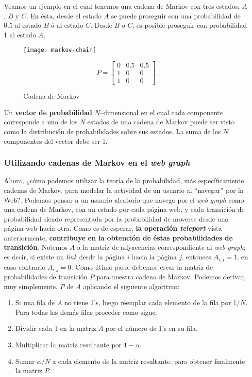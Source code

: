 			Veamos un ejemplo en el cual tenemos una cadena de Markov con tres estados: $A$, $B$ y $C$. En ésta, desde el estado $A$ se puede proseguir con una probabilidad de 0.5 al estado $B$ ó al estado $C$. Desde $B$ o $C$, es posible proseguir con probabilidad 1 al estado $A$. \par
			
			\begin{figure}[]
				\centering
				\texttt{[image: markov-chain]}
				
				\[
			P =
			\begin{bmatrix}
				0 & 0.5 & 0.5 \\
				1 & 0 & 0 \\
				1 & 0 & 0
			\end{bmatrix}
			\]
			
				\caption{Cadena de Markov}
			\end{figure}
			
			Un \textbf{vector de probabilidad} $N$--dimensional en el cual cada componente corresponde a uno de los $N$ estados de una cadena de Markov puede ser visto como la distribución de probabilidades sobre sus estados. La suma de los $N$ componentes del vector debe ser 1. \par
			
		\subsubsection{Utilizando cadenas de Markov en el \textit{web graph}}
			Ahora, ¿cómo podemos utilizar la teoría de la probabilidad, más específicamente cadenas de Markov, para modelar la actividad de un usuario al \enquote{navegar} por la Web?. Podemos pensar a un usuario aleatorio que navega por el \textit{web graph} como una cadena de Markov, con un estado por cada página web, y cada transición de probabilidad siendo representada por la probabilidad de moverse desde una página web hacia otra. Como es de esperar, \textbf{la operación \textit{teleport}} vista anteriormente, \textbf{contribuye en la obtención de éstas probabilidades de transición}. Notemos $A$ a la matriz de adyacencias correspondiente al \textit{web graph}; es decir, si existe un \textit{link} desde la página $i$ hacia la página $j$, entonces $A_{i,j} = 1$, en caso contrario $A_{i,j} = 0$. Como útimo paso, debemos crear la matriz de probabilidades de transición $P$ para nuestra cadena de Markov. Podemos derivar, muy simplemente, $P$ de $A$ aplicando el siguiente algoritmo:
			\begin{enumerate}
				\item Si una fila de $A$ no tiene 1's, luego reemplar cada elemento de la fila por 1/$N$. Para todas las demás filas proceder como sigue.
				\item Dividir cada 1 en la matriz $A$ por el número de 1's en su fila.
				\item Multiplicar la matriz resultante por $1 - \alpha $.
				\item Sumar $\alpha /N$ a cada elemento de la matriz resultante, para obtener finalmente la matriz $P$.
			\end{enumerate}
			
